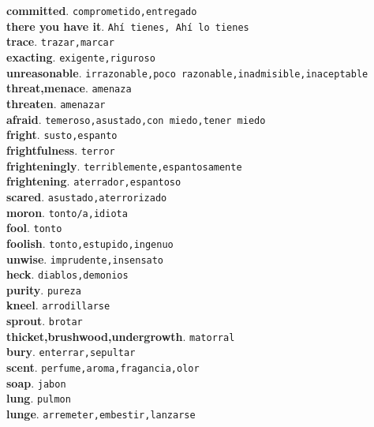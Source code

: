 \documentclass[twocolumn]{article}
\begin{document}
	\textsf{\textbf{committed}}. \texttt{comprometido,entregado}\\
	\textsf{\textbf{there you have it}}. \texttt{Ah\'i tienes, Ah\'i lo tienes}\\
	\textsf{\textbf{trace}}. \texttt{trazar,marcar}\\
	\textsf{\textbf{exacting}}. \texttt{exigente,riguroso}\\
	\textsf{\textbf{unreasonable}}. \texttt{irrazonable,poco razonable,inadmisible,inaceptable}\\
	\textsf{\textbf{threat,menace}}. \texttt{amenaza}\\
	\textsf{\textbf{threaten}}. \texttt{amenazar}\\
	\textsf{\textbf{afraid}}. \texttt{temeroso,asustado,con miedo,tener miedo}\\
	\textsf{\textbf{fright}}. \texttt{susto,espanto}\\
	\textsf{\textbf{frightfulness}}. \texttt{terror}\\
	\textsf{\textbf{frighteningly}}. \texttt{terriblemente,espantosamente}\\
	\textsf{\textbf{frightening}}. \texttt{aterrador,espantoso}\\
	\textsf{\textbf{scared}}. \texttt{asustado,aterrorizado}\\
	\textsf{\textbf{moron}}. \texttt{tonto/a,idiota}\\
	\textsf{\textbf{fool}}. \texttt{tonto}\\
	\textsf{\textbf{foolish}}. \texttt{tonto,estupido,ingenuo}\\
	\textsf{\textbf{unwise}}. \texttt{imprudente,insensato}\\
	\textsf{\textbf{heck}}. \texttt{diablos,demonios}\\
	\textsf{\textbf{purity}}. \texttt{pureza}\\
	\textsf{\textbf{kneel}}. \texttt{arrodillarse}\\
	\textsf{\textbf{sprout}}. \texttt{brotar}\\
	\textsf{\textbf{thicket,brushwood,undergrowth}}. \texttt{matorral}\\
	\textsf{\textbf{bury}}. \texttt{enterrar,sepultar}\\
	\textsf{\textbf{scent}}. \texttt{perfume,aroma,fragancia,olor}\\
	\textsf{\textbf{soap}}. \texttt{jabon}\\
	\textsf{\textbf{lung}}. \texttt{pulmon}\\
	\textsf{\textbf{lunge}}. \texttt{arremeter,embestir,lanzarse}\\
\end{document}
